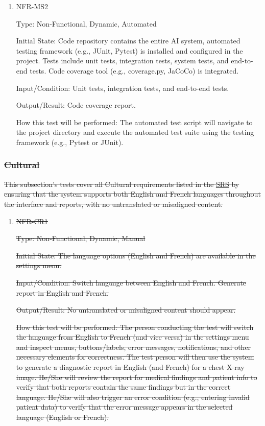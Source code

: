 \documentclass[12pt, titlepage]{article}
\begin{document}
\begin{enumerate}
\begin{enumerate}
\begin{enumerate}
\begin{enumerate}
\item{NFR-MS2\\}\label{NFR-MS2}

Type: Non-Functional, Dynamic, Automated

Initial State: Code repository contains the entire AI system, automated testing framework (e.g., JUnit, Pytest) is installed and configured in the project. Tests include unit tests, integration tests, system tests, and end-to-end tests. Code coverage tool (e.g., coverage.py, JaCoCo) is integrated.

Input/Condition: Unit tests, integration tests, and end-to-end tests.

Output/Result: Code coverage report.

How this test will be performed: The automated test script will navigate to the project directory and execute the automated test suite using the testing framework (e.g., Pytest or JUnit).

\end{enumerate}

\subsubsection{\sout{Cultural}}

\sout{This subsection's tests cover all Cultural requirements listed in the \href{https://github.com/RezaJodeiri/CXR-Capstone/blob/main/docs/SRS/SRS.pdf}{SRS} \citep{SRS}
 by ensuring that the system supports both English and French languages throughout the interface and reports, with no untranslated or misaligned content.}

\begin{enumerate}

\item{\sout{NFR-CR1}\\}\label{NFR-CR1}

\sout{Type: Non-Functional, Dynamic, Manual}

\sout{Initial State: The language options (English and French) are available in the settings menu.}

\sout{Input/Condition: Switch language between English and French. Generate report in English and French.}

\sout{Output/Result: No untranslated or misaligned content should appear.}

\sout{How this test will be performed: The person conducting the test will switch the language from English to French (and vice versa) in the settings menu and inspect menus, buttons/labels, error messages, notifications, and other necessary elements for correctness. The test person will then use the system to generate a diagnostic report in English (and French) for a chest X-ray image. He/She will review the report for medical findings and patient info to verify that both reports contain the same findings but in the correct language. He/She will also trigger an error condition (e.g., entering invalid patient data) to verify that the error message appears in the selected language (English or French).}


\end{enumerate}
\end{enumerate}
\end{enumerate}
\end{enumerate}
\end{document}
